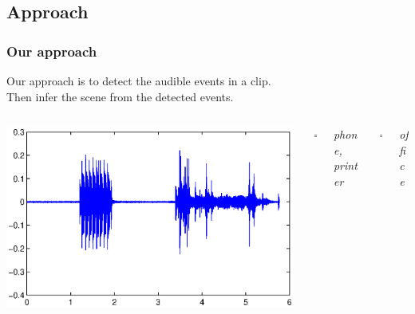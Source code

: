 \documentclass[xcolor=table,slidestop,compress,mathserif]{beamer}
\begin{document}
\subsection{Approach}
\begin{frame}
  \frametitle{Our approach}
	Our approach is to detect the audible events in a clip. \\
	Then infer the scene from the detected events. 	
		
	\vspace{0.5cm}
	\begin{columns}[c]
		\begin{column}{0.5\textwidth}
			\includegraphics[scale=0.4]{./figure/office.eps}
		\end{column}
		\begin{column}{0.05\textwidth}
			$\Rightarrow$
		\end{column}
		\begin{column}{0.15\textwidth}
			\textit{phone, printer}
		\end{column}
		\begin{column}{0.05\textwidth}
			$\Rightarrow$
		\end{column}
		\begin{column}{0.2\textwidth}
			\textit{office}
		\end{column}
	\end{columns}

\end{frame}
\end{document}
